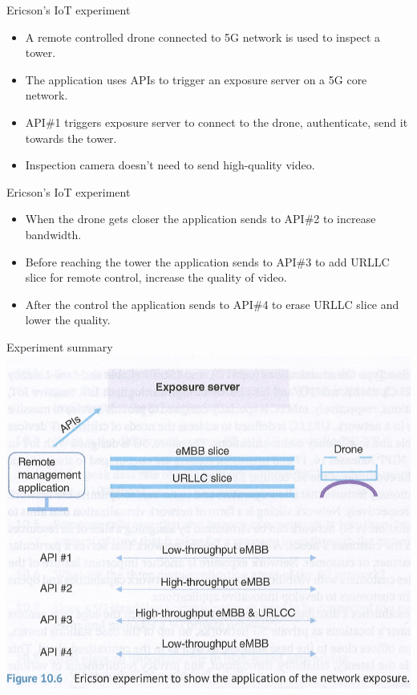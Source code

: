 \documentclass{beamer}
\begin{document}
\begin{frame}{Ericson's IoT experiment}
  \vspace*{1.3em}
  \begin{itemize}
    \item A remote controlled drone connected to 5G network is used to inspect a tower.
    \item The application uses APIs to trigger an exposure server on a 5G core network.
    \item API\#1 triggers exposure server to connect to the drone, authenticate, send it towards the tower.
    \item Inspection camera doesn't need to send high-quality video. 
  \end{itemize}
\end{frame}

\begin{frame}{Ericson's IoT experiment}
  \vspace*{1.6em}
  \begin{itemize}
    \item When the drone gets closer the application sends to API\#2 to increase bandwidth.
    \item Before reaching the tower the application sends to API\#3 to add URLLC slice for remote control, increase the quality of video.
    \item After the control the application sends to API\#4 to erase URLLC slice and lower the quality.
  \end{itemize}
\end{frame}

\begin{frame}{Experiment summary}
  \hspace*{0.4em}
  \includegraphics[scale=0.52]{fig/exposure-exp.png}
\end{frame}
\end{document}
